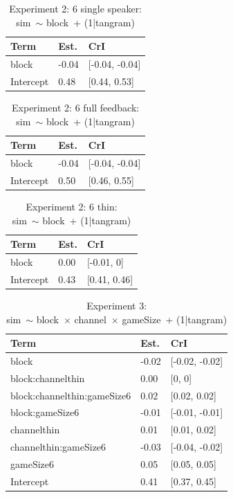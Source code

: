 \documentclass[
  english,
  a4paper,
]{article}
\begin{document}
\begin{table}[h!]

\caption{\label{tab:unnamed-chunk-13}Experiment 2: 6 single speaker:\\ sim~$\sim$ block~+ (1|tangram)}
\centering
\begin{tabular}[t]{lll}
\toprule
Term & Est. & CrI\\
\midrule
block & -0.04 & {}[-0.04, -0.04]\\
Intercept & 0.48 & {}[0.44, 0.53]\\
\bottomrule
\end{tabular}
\end{table}

\begin{table}[h!]

\caption{\label{tab:unnamed-chunk-13}Experiment 2: 6 full feedback:\\ sim~$\sim$ block~+ (1|tangram)}
\centering
\begin{tabular}[t]{lll}
\toprule
Term & Est. & CrI\\
\midrule
block & -0.04 & {}[-0.04, -0.04]\\
Intercept & 0.50 & {}[0.46, 0.55]\\
\bottomrule
\end{tabular}
\end{table}

\begin{table}[h!]

\caption{\label{tab:unnamed-chunk-13}Experiment 2: 6 thin:\\ sim~$\sim$ block~+ (1|tangram)}
\centering
\begin{tabular}[t]{lll}
\toprule
Term & Est. & CrI\\
\midrule
block & 0.00 & {}[-0.01, 0]\\
Intercept & 0.43 & {}[0.41, 0.46]\\
\bottomrule
\end{tabular}
\end{table}

\begin{table}[h!]

\caption{\label{tab:unnamed-chunk-13}Experiment 3:\\ sim~$\sim$ block~$\times$ channel~$\times$ gameSize~+ (1|tangram)}
\centering
\begin{tabular}[t]{lll}
\toprule
Term & Est. & CrI\\
\midrule
block & -0.02 & {}[-0.02, -0.02]\\
block:channelthin & 0.00 & {}[0, 0]\\
block:channelthin:gameSize6 & 0.02 & {}[0.02, 0.02]\\
block:gameSize6 & -0.01 & {}[-0.01, -0.01]\\
channelthin & 0.01 & {}[0.01, 0.02]\\
\addlinespace
channelthin:gameSize6 & -0.03 & {}[-0.04, -0.02]\\
gameSize6 & 0.05 & {}[0.05, 0.05]\\
Intercept & 0.41 & {}[0.37, 0.45]\\
\bottomrule
\end{tabular}
\end{table}
\end{document}
